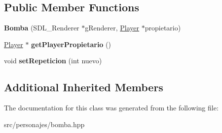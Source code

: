 \subsection*{Public Member Functions}
\begin{DoxyCompactItemize}
\item 
{\bfseries Bomba} (S\+D\+L\+\_\+\+Renderer $\ast$g\+Renderer, \hyperlink{class_player}{Player} $\ast$propietario)\hypertarget{class_bomba_a1e5390984a730fd046847dc8b5334eb5}{}\label{class_bomba_a1e5390984a730fd046847dc8b5334eb5}

\item 
\hyperlink{class_player}{Player} $\ast$ {\bfseries get\+Player\+Propietario} ()\hypertarget{class_bomba_a236e2f12b525c781c1bb518e9e2fa274}{}\label{class_bomba_a236e2f12b525c781c1bb518e9e2fa274}

\item 
void {\bfseries set\+Repeticion} (int nuevo)\hypertarget{class_bomba_a46fe0c87eab4a86edfb0fdec355275ac}{}\label{class_bomba_a46fe0c87eab4a86edfb0fdec355275ac}

\end{DoxyCompactItemize}
\subsection*{Additional Inherited Members}


The documentation for this class was generated from the following file\+:\begin{DoxyCompactItemize}
\item 
src/personajes/bomba.\+hpp\end{DoxyCompactItemize}
